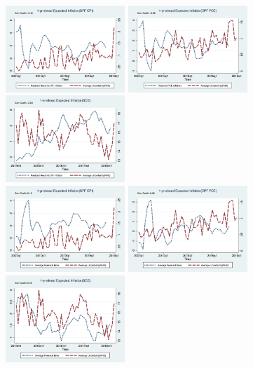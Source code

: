 \documentclass[]{article}
\begin{document}
	
	\begin{figure}[ht]
		\centering
		\smallskip
		\includegraphics[width=4.5cm]{figures/Inf1yf_CPIAU_varSPFCPIQ.png}
		\includegraphics[width=4.5cm]{figures/Inf1yf_PCE_varSPFPCEQ.png}
		\includegraphics[width=4.5cm]{figures/Inf1yf_CPIAU_varSCEM.png}\\
		\smallskip
		\includegraphics[width=4.5cm]{figures/SPFCPI_FE_varSPFCPIQ.png}
		\includegraphics[width=4.5cm]{figures/SPFPCE_FE_varSPFPCEQ.png}
		\includegraphics[width=4.5cm]{figures/SCE_FE_varSCEM.png}\\

\end{figure}
\end{document}
